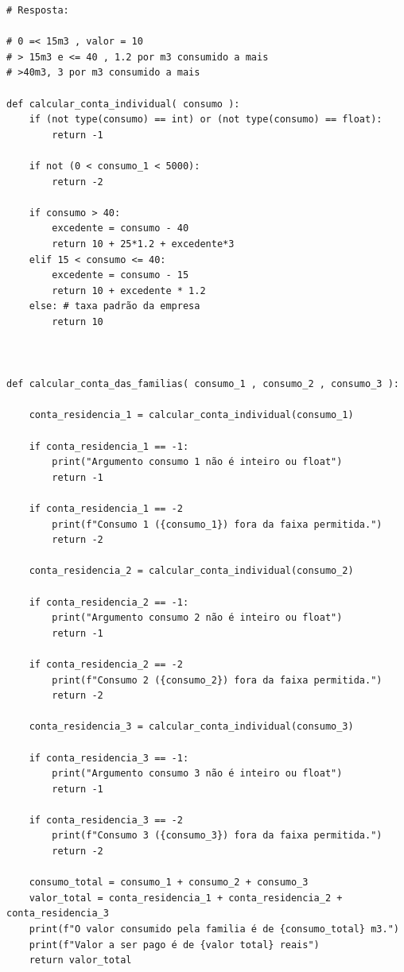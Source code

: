 \ifmostrarGabarito
\begin{verbatim}
# Resposta:

# 0 =< 15m3 , valor = 10
# > 15m3 e <= 40 , 1.2 por m3 consumido a mais
# >40m3, 3 por m3 consumido a mais

def calcular_conta_individual( consumo ):
    if (not type(consumo) == int) or (not type(consumo) == float):
        return -1
        
    if not (0 < consumo_1 < 5000):
        return -2

    if consumo > 40:
        excedente = consumo - 40
        return 10 + 25*1.2 + excedente*3
    elif 15 < consumo <= 40:
        excedente = consumo - 15
        return 10 + excedente * 1.2
    else: # taxa padrão da empresa
        return 10



def calcular_conta_das_familias( consumo_1 , consumo_2 , consumo_3 ):

    conta_residencia_1 = calcular_conta_individual(consumo_1)

    if conta_residencia_1 == -1:
        print("Argumento consumo 1 não é inteiro ou float")
        return -1

    if conta_residencia_1 == -2
        print(f"Consumo 1 ({consumo_1}) fora da faixa permitida.")
        return -2

    conta_residencia_2 = calcular_conta_individual(consumo_2)

    if conta_residencia_2 == -1:
        print("Argumento consumo 2 não é inteiro ou float")
        return -1

    if conta_residencia_2 == -2
        print(f"Consumo 2 ({consumo_2}) fora da faixa permitida.")
        return -2

    conta_residencia_3 = calcular_conta_individual(consumo_3)

    if conta_residencia_3 == -1:
        print("Argumento consumo 3 não é inteiro ou float")
        return -1

    if conta_residencia_3 == -2
        print(f"Consumo 3 ({consumo_3}) fora da faixa permitida.")
        return -2

    consumo_total = consumo_1 + consumo_2 + consumo_3
    valor_total = conta_residencia_1 + conta_residencia_2 + conta_residencia_3
    print(f"O valor consumido pela familia é de {consumo_total} m3.")
    print(f"Valor a ser pago é de {valor total} reais")
    return valor_total


\end{verbatim}
\fi
